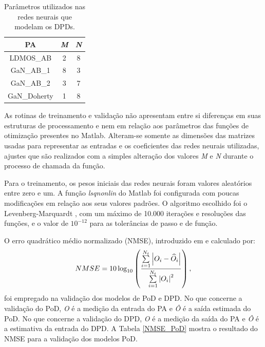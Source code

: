 \begin{table}[H]
\centering
\caption{Parâmetros utilizados nas redes neurais que modelam os DPDs.}
\begin{tabular}{|c|c|c|}
\hline
\rule[-1ex]{0pt}{2.5ex}  \textbf{PA} & \textbf{\textit{M}} & \textbf{\textit{N}} \\ 
\hline 
\rule[-1ex]{0pt}{2.5ex} LDMOS{\_}AB & 2 & 8 \\ 
\hline 
\rule[-1ex]{0pt}{2.5ex} GaN{\_}AB{\_}1 & 8 & 3 \\ 
\hline 
\rule[-1ex]{0pt}{2.5ex} GaN{\_}AB{\_}2 & 3 & 7 \\ 
\hline 
\rule[-1ex]{0pt}{2.5ex} GaN{\_}Doherty & 1 & 8 \\ 
\hline
\end{tabular}

\label{parametros_nn}
\end{table}

As rotinas de treinamento e validação não apresentam entre si diferenças em suas estruturas de processamento e nem em relação aos parâmetros das funções de otimização presentes no Matlab. Alteram-se somente as dimensões das matrizes usadas para representar as entradas e os coeficientes das redes neurais utilizadas, ajustes que são realizados com a simples alteração dos valores \textit{M} e \textit{N} durante o processo de chamada da função.

Para o treinamento, os pesos iniciais das redes neurais foram valores aleatórios entre zero e um. A função \textit{lsqnonlin} do Matlab foi configurada com poucas modificações em relação aos seus valores padrões. O algoritmo escolhido foi o Levenberg-Marquardt {\cite{Marquardt1963}}, com um máximo de 10.000 iterações e resoluções das funções, e o valor de {$10^{-12}$} para as tolerâncias de passo e de função.

O erro quadrático médio normalizado (NMSE), introduzido em \cite{muha_validation_1999} e calculado por:
\begin{equation}
NMSE = 10\log_{10}
\left(
\frac
{\sum\limits_{i=1}^{N_{t}}
\abs{O_{i}-\widehat{O}_{i}}}
{\sum\limits_{i=1}^{N_{t}}
\abs{O_{i}}^2}
\right) ,
\label{nmse}
\end{equation}
foi empregado na validação dos modelos de PoD e DPD. No que concerne a validação do PoD, \textit{O} é a medição da entrada do PA e \textit{Ô} é a saída estimada do PoD. No que concerne a validação do DPD, \textit{O} é a medição da saída do PA e \textit{Ô} é a estimativa da entrada do DPD. A Tabela \ref{NMSE_PoD} mostra o resultado do NMSE para a validação dos modelos PoD.

